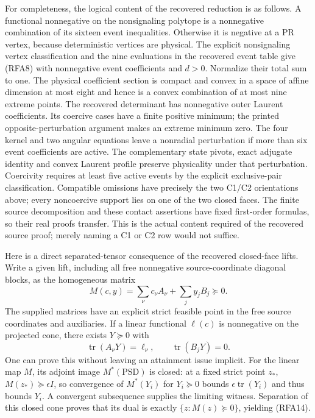 For completeness, the logical content of the recovered reduction is as
follows. A functional nonnegative on the nonsignaling polytope is a
nonnegative combination of its sixteen event inequalities. Otherwise it
is negative at a PR vertex, because deterministic vertices are physical.
The explicit nonsignaling vertex classification and the nine evaluations
in the recovered event table give (RFA8) with nonnegative event
coefficients and $d>0$. Normalize their total sum to one. The physical
coefficient section is compact and convex in a space of affine dimension
at most eight and hence is a convex combination of at most nine extreme
points. The recovered determinant has nonnegative outer Laurent
coefficients. Its coercive cases have a finite positive minimum; the
printed opposite-perturbation argument makes an extreme minimum zero.
The four kernel and two angular equations leave a nonradial perturbation
if more than six event coefficients are active. The complementary state
pivots, exact adjugate identity and convex Laurent profile preserve
physicality under that perturbation. Coercivity requires at least five
active events by the explicit exclusive-pair classification. Compatible
omissions have precisely the two C1/C2 orientations above; every
noncoercive support lies on one of the two closed faces. The finite
source decomposition and these contact assertions have fixed first-order
formulas, so their real proofs transfer. This is the actual content
required of the recovered source proof; merely naming a C1 or C2 row
would not suffice.

Here is a direct separated-tensor consequence of the recovered
closed-face lifts. Write a given lift, including all free nonnegative
source-coordinate diagonal blocks, as the homogeneous matrix
\[
 M(c,y)=\sum_\nu c_\nu A_\nu+\sum_jy_jB_j\succeq0.
\]
The supplied matrices have an explicit strict feasible point in the
free source coordinates and auxiliaries. If a linear functional
$\ell(c)$ is nonnegative on the projected cone, there exists $Y\succeq0$
with
\[
 \operatorname{tr}(A_\nu Y)=\ell_\nu,\qquad
 \operatorname{tr}(B_jY)=0.                          \tag{RFA14}
\]
One can prove this without leaving an attainment issue implicit.
For the linear map $M$, its adjoint image $M^*(\mathrm{PSD})$ is
closed: at a fixed strict point $z_*$, $M(z_*)\succeq\epsilon I$,
so convergence of $M^*(Y_i)$ for $Y_i\succeq0$ bounds
$\epsilon\operatorname{tr}(Y_i)$ and thus bounds $Y_i$.
A convergent subsequence supplies the limiting witness. Separation
of this closed cone proves that its dual is exactly
$\{z:M(z)\succeq0\}$, yielding (RFA14).

